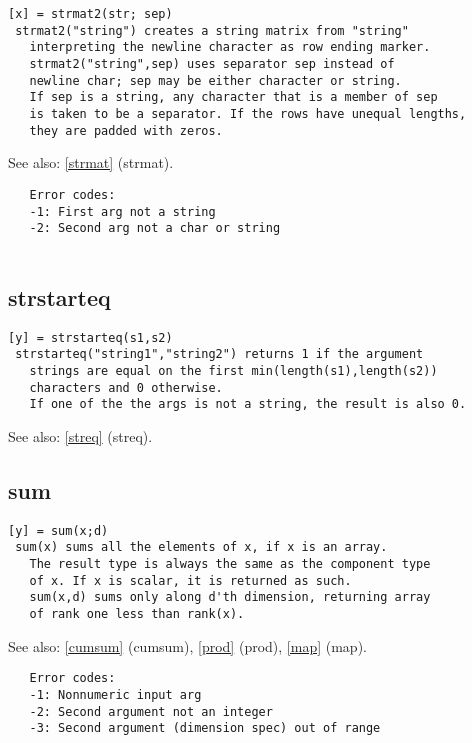 \documentclass[a4paper]{article}
\begin{document}
\begin{tscreen}
\begin{verbatim}
[x] = strmat2(str; sep)
 strmat2("string") creates a string matrix from "string"
   interpreting the newline character as row ending marker.
   strmat2("string",sep) uses separator sep instead of
   newline char; sep may be either character or string.
   If sep is a string, any character that is a member of sep
   is taken to be a separator. If the rows have unequal lengths,
   they are padded with zeros.
\end{verbatim}

See also: \ref{strmat} {(strmat)}.
\begin{verbatim}
   Error codes:
   -1: First arg not a string
   -2: Second arg not a char or string
   
\end{verbatim}
\end{tscreen}





\subsection{strstarteq\label{strstarteq}}

\begin{tscreen}
\begin{verbatim}
[y] = strstarteq(s1,s2)
 strstarteq("string1","string2") returns 1 if the argument
   strings are equal on the first min(length(s1),length(s2))
   characters and 0 otherwise.
   If one of the the args is not a string, the result is also 0.
\end{verbatim}

See also: \ref{streq} {(streq)}.
\end{tscreen}





\subsection{sum\label{sum}}

\begin{tscreen}
\begin{verbatim}
[y] = sum(x;d)
 sum(x) sums all the elements of x, if x is an array.
   The result type is always the same as the component type
   of x. If x is scalar, it is returned as such.
   sum(x,d) sums only along d'th dimension, returning array
   of rank one less than rank(x).
\end{verbatim}

See also: \ref{cumsum} {(cumsum)}, \ref{prod} {(prod)}, \ref{map} {(map)}.
\begin{verbatim}
   Error codes:
   -1: Nonnumeric input arg
   -2: Second argument not an integer
   -3: Second argument (dimension spec) out of range 
\end{verbatim}
\end{tscreen}
\end{document}
